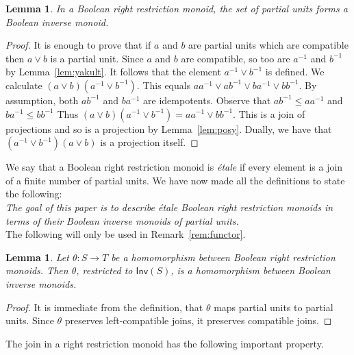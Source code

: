 \documentclass[a4paper]{amsart}
\newtheorem{lemma}[theorem]{Lemma}
\begin{document}
\begin{lemma}\label{lem:sleet} In a Boolean right restriction monoid,
the set of partial units forms a Boolean inverse monoid.
\end{lemma}
\begin{proof} It is enough to prove that if $a$ and $b$ are partial units which are compatible then $a \vee b$ is a partial unit.
Since $a$ and $b$ are compatible, so too are $a^{-1}$ and $b^{-1}$
by Lemma~\ref{lem:yakult}.
It follows that the element
$a^{-1} \vee b^{-1}$ is defined.
We calculate $(a \vee b)(a^{-1} \vee b^{-1})$.
This equals $aa^{-1} \vee ab^{-1} \vee ba^{-1} \vee bb^{-1}$.
By assumption, both $ab^{-1}$ and $ba^{-1}$ are idempotents.
Observe that $ab^{-1} \leq aa^{-1}$ and $ba^{-1} \leq bb^{-1}$
Thus $(a \vee b)(a^{-1} \vee b^{-1}) = aa^{-1} \vee bb^{-1}$.
This is a join of projections and so is a projection by Lemma~\ref{lem:posy}.
Dually, we have that $(a^{-1} \vee b^{-1})(a \vee b)$ is a projection itself.
\end{proof}

We say that a Boolean right restriction monoid is {\em \'etale} if every element
is a join of a finite number of partial units.
We have now made all the definitions to state the following:\\

{\em The goal of this paper is to describe \'etale Boolean right restriction monoids in terms of their Boolean inverse monoids of partial units.}\\



The following will only be used in Remark~\ref{rem:functor}.

\begin{lemma}\label{lem:functor} Let $\theta \colon S \rightarrow T$ be a homomorphism between 
Boolean right restriction monoids.
Then $\theta$, restricted to $\mathsf{Inv}(S)$, is a homomorphism between Boolean inverse monoids.
\end{lemma}
\begin{proof}
It is immediate from the definition, that $\theta$ maps partial units to partial units.
Since $\theta$ preserves left-compatible joins, it preserves compatible joins.
\end{proof} 



The join in a  right restriction monoid has the following important property.
\end{document}
